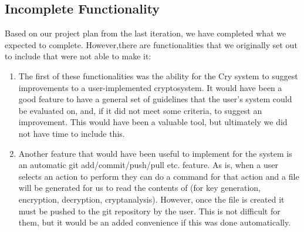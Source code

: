\subsection{Incomplete Functionality}

Based on our project plan from the last iteration, we have
completed what we expected to complete. However,there are
functionalities that we originally set out to include that
were not able to make it:


\begin{enumerate}
\item The first of these functionalities was the ability
  for the Cry system to suggest improvements to a
  user-implemented cryptosystem. It would have been a good
  feature to have a general set of guidelines that the
  user's system could be evaluated on, and, if it did not
  meet some criteria, to suggest an improvement. This would
  have been a valuable tool, but ultimately we did not have
  time to include this.
\item Another feature that would have been useful to
  implement for the system is an automatic git
  add/commit/push/pull etc. feature. As is, when a user
  selects an action to perform they can do a command for
  that action and a file will be generated for us to read
  the contents of (for key generation, encryption,
  decryption, cryptanalysis). However, once the file is
  created it must be pushed to the git repository by the
  user. This is not difficult for them, but it would be an
  added convenience if this was done automatically.
\end{enumerate}
